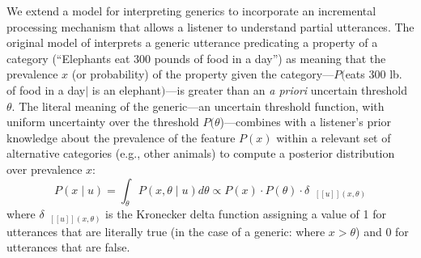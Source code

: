 \documentclass[10pt,letterpaper]{article}
\newcommand{\denote}[1]{\mbox{ $[\![ #1 ]\!]$}}
\begin{document}
We extend a model for interpreting generics to incorporate an incremental processing mechanism that allows a listener to understand partial utterances.
The original model of  interprets a generic utterance predicating a property of a category (``Elephants eat 300 pounds of food in a day'') as meaning that the prevalence $x$ (or probability) of the property given the category---$P($eats 300 lb. of food in a day$\mid$ is an elephant$)$---is greater than an \emph{a priori} uncertain threshold $\theta$.
The literal meaning of the generic---an uncertain threshold function, with uniform uncertainty over the threshold $P(\theta$)---combines with a listener's prior knowledge about the prevalence of the feature $P(x)$ within a relevant set of alternative categories (e.g., other animals) to compute a posterior distribution over prevalence $x$:
%
\begin{equation}
P(x \mid u) = \int_{\theta} P(x, \theta \mid u)  d\theta \propto P(x) \cdot P(\theta) \cdot \delta_{\denote{u}(x, \theta)} 
\label{eq:L0}
\end{equation}
\noindent where $\delta_{\denote{u}(x, \theta)}$ is the Kronecker delta function assigning a value of 1 for utterances that are literally true (in the case of a generic: where $x > \theta$) and 0 for utterances that are false.
\end{document}
